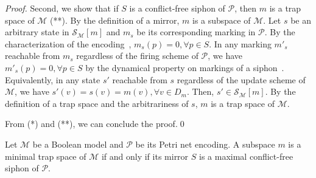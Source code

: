 \documentclass[runningheads]{llncs}
\begin{document}
\begin{proof}
  Second, we show that if \(S\) is a conflict-free siphon of \(\mathcal{P}\), then \(m\) is a trap space of \(\mathcal{M}\) (**). By the definition of a mirror, \(m\) is a subspace of \(\mathcal{M}\). Let \(s\) be an arbitrary state in \(\mathcal{S}_{\mathcal{M}}[m]\) and \(m_s\) be its corresponding marking in \(\mathcal{P}\). By the characterization of the encoding~\cite{chaouiya2004qualitative}, \(m_s(p) = 0, \forall p \in S\). In any marking \(m'_s\) reachable from \(m_s\) regardless of the firing scheme of \(\mathcal{P}\), we have \(m'_s(p) = 0, \forall p \in S\) by the dynamical property on markings of a siphon~\cite{DBLP:journals/isci/LiuB16}. Equivalently, in any state \(s'\) reachable from \(s\) regardless of the update scheme of \(\mathcal{M}\), we have \(s'(v) = s(v) = m(v), \forall v \in D_m\). Then, \(s' \in \mathcal{S}_{\mathcal{M}}[m]\). By the definition of a trap space and the arbitrariness of \(s\), \(m\) is a trap space of \(\mathcal{M}\).

  From (*) and (**), we can conclude the proof.\qed%
\end{proof}

\begin{theorem}%
\label{theo:min_ts_2_max_sp}

  Let \(\mathcal{M}\) be a Boolean model and \(\mathcal{P}\) be its Petri net encoding. A subspace \(m\) is a minimal trap space of \(\mathcal{M}\) if and only if its mirror \(S\) is a maximal conflict-free siphon of \(\mathcal{P}\).

\end{theorem}
\end{document}
